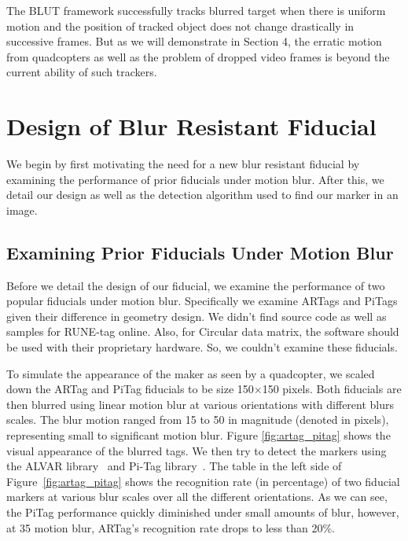 \documentclass[runningheads]{llncs}
\begin{document}
The BLUT framework successfully tracks blurred target when there is uniform motion
and the position of tracked object does not change drastically in successive
frames. But as we will demonstrate in Section 4, the erratic motion from quadcopters as
well as the problem of dropped video frames is beyond the current ability of such trackers.

\section{Design of Blur Resistant Fiducial}

We begin by first motivating the need for a new blur resistant fiducial by examining
the performance of prior fiducials under motion blur.  After this, we detail
our design as well as the detection algorithm used to find our marker in an image.

\subsection{Examining Prior Fiducials Under Motion Blur}\label{sec:blurtest}

Before we detail the design of our fiducial, we examine the performance of two
popular fiducials under motion blur.  Specifically we examine  ARTags
\cite{Fiala05} and PiTags\cite{Pitag13} given their difference in geometry design.
We didn't find source code as well as samples for RUNE-tag\cite{runetag11}
online. Also, for Circular data matrix\cite{NaimarkF02}, the software should be
used with their proprietary hardware. So, we couldn't examine these fiducials. 


To simulate the appearance of the maker as seen by a quadcopter,  we scaled down
the ARTag and PiTag fiducials to be size 150$\times$150 pixels. Both fiducials are then blurred
using linear motion blur at various orientations with different blurs scales.  
The blur motion ranged from 15 to 50 in magnitude (denoted in pixels),
representing small to significant motion blur. Figure \ref{fig:artag_pitag}
shows the visual appearance of the blurred tags.  We then try to detect the
markers using the ALVAR library~\cite{alvar} and Pi-Tag
library~\cite{ros_pitag}. The table in the left side of
Figure~\ref{fig:artag_pitag} shows the recognition rate (in percentage) of two
fiducial markers at various blur scales over all the different orientations.  
As we can see, the PiTag performance quickly diminished under small amounts of
blur, however, at 35 motion blur, ARTag's recognition rate drops to less than
20\%.
\end{document}
